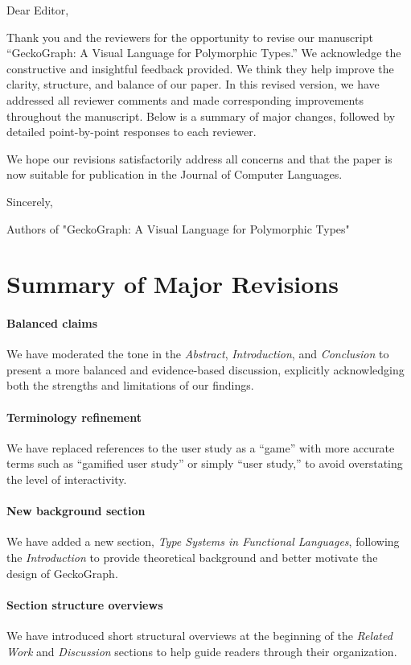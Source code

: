 \documentclass{article}
\begin{document}
Dear Editor,

Thank you and the reviewers for the opportunity to revise our manuscript “GeckoGraph: A Visual Language for Polymorphic Types.”
We acknowledge the constructive and insightful feedback provided. We think they help improve the clarity, structure, and balance of our paper.
In this revised version, we have addressed all reviewer comments and made corresponding improvements throughout the manuscript. Below is a summary of major changes, followed by detailed point-by-point responses to each reviewer.

We hope our revisions satisfactorily address all concerns and that the paper is now suitable for publication in the Journal of Computer Languages.

Sincerely,

Authors of "GeckoGraph: A Visual Language for Polymorphic Types"
\section{Summary of Major Revisions}

\paragraph{Balanced claims} We have moderated the tone in the \textit{Abstract}, \textit{Introduction}, and \textit{Conclusion} to present a more balanced and evidence-based discussion, explicitly acknowledging both the strengths and limitations of our findings.

\paragraph{Terminology refinement} We have replaced references to the user study as a “game” with more accurate terms such as “gamified user study” or simply “user study,” to avoid overstating the level of interactivity.

\paragraph{New background section} We have added a new section, \textit{Type Systems in Functional Languages}, following the \textit{Introduction} to provide theoretical background and better motivate the design of GeckoGraph.

\paragraph{Section structure overviews} We have introduced short structural overviews at the beginning of the \textit{Related Work} and \textit{Discussion} sections to help guide readers through their organization.
\end{document}
